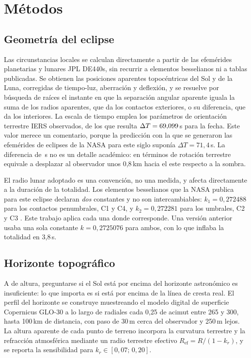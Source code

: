 \documentclass[10pt,a4paper]{article}
\begin{document}
\section{Métodos}

\subsection{Geometría del eclipse}

Las circunstancias locales se calculan directamente a partir de las efemérides
planetarias y lunares JPL DE440s, sin recurrir a elementos besselianos ni a
tablas publicadas. Se obtienen las posiciones aparentes topocéntricas del Sol y
de la Luna, corregidas de tiempo-luz, aberración y deflexión, y se resuelve por
búsqueda de raíces el instante en que la separación angular aparente iguala la
suma de los radios aparentes, que da los contactos exteriores, o su diferencia,
que da los interiores. La escala de tiempo emplea los parámetros de orientación
terrestre IERS observados, de los que resulta $\Delta T = 69{,}099$\,s para la
fecha. Este valor merece un comentario, porque la predicción con la que se
generaron las efemérides de eclipses de la NASA para este siglo suponía
$\Delta T = 71{,}4$\,s. La diferencia de \deltaTdiff\,s no es un detalle académico: en
términos de rotación terrestre equivale a desplazar al observador unos
0,8\,km hacia el este respecto a la sombra.

El radio lunar adoptado es una convención, no una medida, y afecta directamente
a la duración de la totalidad. Los elementos besselianos que la NASA publica
para este eclipse declaran \emph{dos} constantes y no son intercambiables:
$k_1 = 0{,}272488$ para los contactos penumbrales, C1 y C4, y
$k_2 = 0{,}272281$ para los umbrales, C2 y C3 \cite{espenak2006}. Este trabajo
aplica cada una donde corresponde. Una versión anterior usaba una sola constante
$k = 0{,}2725076$ para ambos, con lo que inflaba la totalidad en 3,8\,s.

\subsection{Horizonte topográfico}

A \altMax\textdegree{} de altura, preguntarse si el Sol está por encima del
horizonte astronómico es insuficiente: lo que importa es si está por encima de
la línea de cresta real. El perfil del horizonte se construye muestreando el
modelo digital de superficie Copernicus GLO-30 a lo largo de radiales cada
0,25\textdegree{} de acimut entre 265\textdegree{} y 300\textdegree{}, hasta
100\,km de distancia, con paso de 30\,m cerca del observador y 250\,m lejos. La
altura aparente de cada punto de terreno incorpora la curvatura terrestre y la
refracción atmosférica mediante un radio terrestre efectivo
$R_{\mathrm{ef}} = R/(1-k_r)$, y se reporta la sensibilidad para
$k_r \in [0{,}07;\,0{,}20]$.
\end{document}
